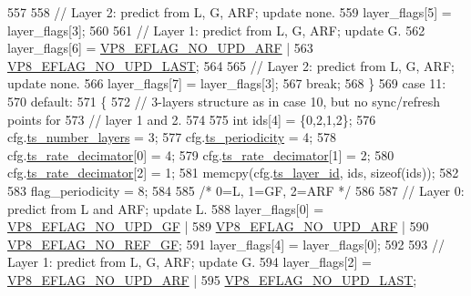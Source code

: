 \begin{DoxyCodeInclude}
{{{{{{{{{{{{{{{557 
558         \textcolor{comment}{// Layer 2: predict from L, G, ARF; update none.}
559         layer\_flags[5] = layer\_flags[3];
560 
561         \textcolor{comment}{// Layer 1: predict from L, G, ARF; update G.}
562         layer\_flags[6] = \hyperlink{group__vp8__encoder_ga1cff46a5287e73a620660030d40b9e6c}{VP8\_EFLAG\_NO\_UPD\_ARF} |
563                          \hyperlink{group__vp8__encoder_ga602edb6b02a89cb2db7a16d6dffba583}{VP8\_EFLAG\_NO\_UPD\_LAST};
564 
565         \textcolor{comment}{// Layer 2: predict from L, G, ARF; update none.}
566         layer\_flags[7] = layer\_flags[3];
567         \textcolor{keywordflow}{break};
568     \}
569     \textcolor{keywordflow}{case} 11:
570     \textcolor{keywordflow}{default}:
571     \{
572        \textcolor{comment}{// 3-layers structure as in case 10, but no sync/refresh points for}
573        \textcolor{comment}{// layer 1 and 2.}
574 
575        \textcolor{keywordtype}{int} ids[4] = \{0,2,1,2\};
576        cfg.\hyperlink{structvpx__codec__enc__cfg_a16d4549a30cbd585e3c3056ef873d8c7}{ts\_number\_layers}     = 3;
577        cfg.\hyperlink{structvpx__codec__enc__cfg_a4ec338780115dd270acf0dac24193474}{ts\_periodicity}       = 4;
578        cfg.\hyperlink{structvpx__codec__enc__cfg_ad40c30846ef8ef1d8684f10a491ec535}{ts\_rate\_decimator}[0] = 4;
579        cfg.\hyperlink{structvpx__codec__enc__cfg_ad40c30846ef8ef1d8684f10a491ec535}{ts\_rate\_decimator}[1] = 2;
580        cfg.\hyperlink{structvpx__codec__enc__cfg_ad40c30846ef8ef1d8684f10a491ec535}{ts\_rate\_decimator}[2] = 1;
581        memcpy(cfg.\hyperlink{structvpx__codec__enc__cfg_a4d105d2470dbfb7210b33d298f1cf1f6}{ts\_layer\_id}, ids, \textcolor{keyword}{sizeof}(ids));
582 
583        flag\_periodicity = 8;
584 
585        \textcolor{comment}{/* 0=L, 1=GF, 2=ARF */}
586 
587        \textcolor{comment}{// Layer 0: predict from L and ARF; update L.}
588        layer\_flags[0] = \hyperlink{group__vp8__encoder_gab01d066c5236457d345ce1cab4c41d6b}{VP8\_EFLAG\_NO\_UPD\_GF} |
589                         \hyperlink{group__vp8__encoder_ga1cff46a5287e73a620660030d40b9e6c}{VP8\_EFLAG\_NO\_UPD\_ARF} |
590                         \hyperlink{group__vp8__encoder_gabb5e95343a2738abef44eca13059da33}{VP8\_EFLAG\_NO\_REF\_GF};
591        layer\_flags[4] = layer\_flags[0];
592 
593        \textcolor{comment}{// Layer 1: predict from L, G, ARF; update G.}
594        layer\_flags[2] = \hyperlink{group__vp8__encoder_ga1cff46a5287e73a620660030d40b9e6c}{VP8\_EFLAG\_NO\_UPD\_ARF} |
595                         \hyperlink{group__vp8__encoder_ga602edb6b02a89cb2db7a16d6dffba583}{VP8\_EFLAG\_NO\_UPD\_LAST};
}}}}}}}}}}}}}}}
\end{DoxyCodeInclude}
